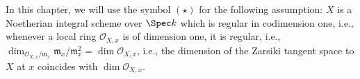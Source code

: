 In this chapter, we will use the symbol $(\star)$ for the following assumption: $X$ is a Noetherian
integral scheme over $\Spec k$ which is regular in codimension one, i.e., whenever a local ring $\mathcal{O}_{X, x}$
is of dimension one, it is regular, i.e., $\dim_{\mathcal{O}_{X, x}/\mathfrak{m}_x} \mathfrak{m}_x/\mathfrak{m}_x^2 = \dim \mathcal{O}_{X, x}$,
i.e., the dimension of the Zarsiki tangent space to $X$ at $x$ coincides with $\dim \mathcal{O}_{X, x}$.
